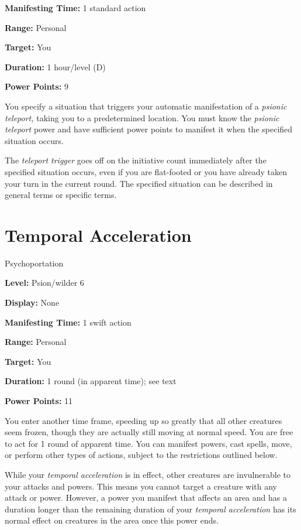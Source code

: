 \documentclass{article}
\begin{document}
\textbf{Manifesting Time:} 1 standard action

\textbf{Range:} Personal

\textbf{Target:} You

\textbf{Duration:} 1 hour/level (D)

\textbf{Power Points:} 9

You specify a situation that triggers your automatic manifestation of a \textit{psionic 
teleport, }taking you to a predetermined location. You must know the \textit{psionic 
teleport }power and have sufficient power points to manifest it when the specified 
situation occurs.

The \textit{teleport trigger }goes off on the initiative count immediately after 
the specified situation occurs, even if you are flat-footed or you have already 
taken your turn in the current round. The specified situation can be described 
in general terms or specific terms.

\vspace{12pt}
\section*{Temporal Acceleration}

Psychoportation

\textbf{Level:} Psion/wilder 6

\textbf{Display:} None

\textbf{Manifesting Time:} 1 swift action

\textbf{Range:} Personal

\textbf{Target:} You

\textbf{Duration:} 1 round (in apparent time); see text

\textbf{Power Points:} 11

You enter another time frame, speeding up so greatly that all other creatures seem 
frozen, though they are actually still moving at normal speed. You are free to 
act for 1 round of apparent time. You can manifest powers, cast spells, move, or 
perform other types of actions, subject to the restrictions outlined below.

While your \textit{temporal acceleration }is in effect, other creatures are invulnerable 
to your attacks and powers. This means you cannot target a creature with any attack 
or power. However, a power you manifest that affects an area and has a duration 
longer than the remaining duration of your \textit{temporal acceleration }has its 
normal effect on creatures in the area once this power ends.
\end{document}
